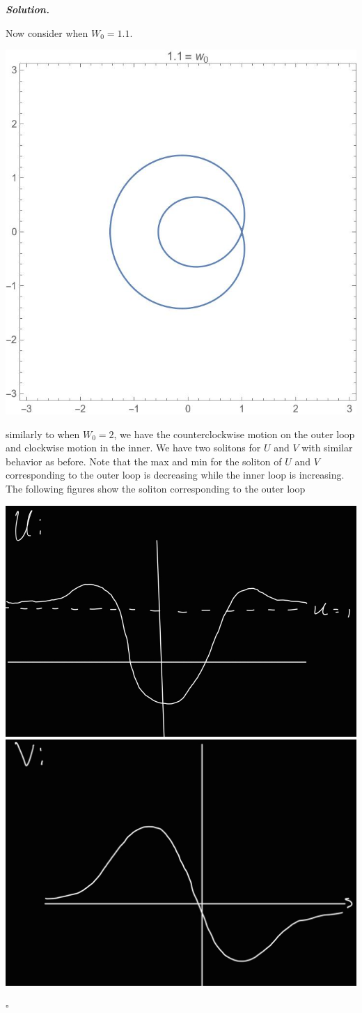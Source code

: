 \documentclass[12pt]{report}
\newenvironment{solution}[1][\it{Solution}]{\textbf{#1. } }{$\square$}
\begin{document}
\begin{solution}
\begin{enumerate}
        \noindent
        Now consider when $W_0 = 1.1$.
        \begin{center}
            \includegraphics[width=.5\linewidth]{plots/1-3.jpg}
        \end{center}
        similarly to when $W_0 = 2$, we have the counterclockwise motion on the outer loop and clockwise motion in the inner. We have two solitons for $U$ and $V$ with similar behavior as before. Note that the max and min for the soliton of $U$ and $V$ corresponding to the outer loop is decreasing while the inner loop is increasing. The following figures show the soliton corresponding to the outer loop
        
        \begin{center}
            \includegraphics[width=.4\linewidth]{plots/fig5.jpg}
            \includegraphics[width=.4\linewidth]{plots/fig2.jpg}
        \end{center}


\end{enumerate}
\end{solution}
\end{document}
